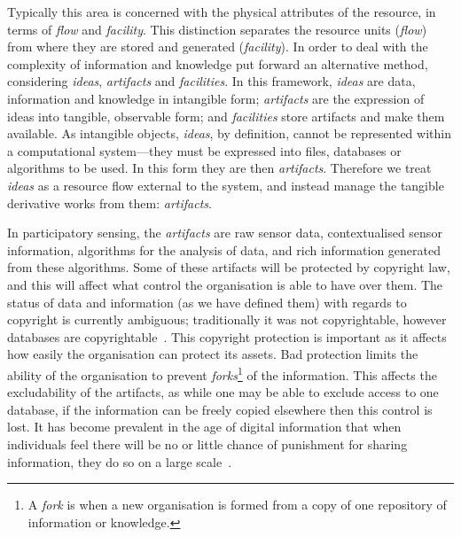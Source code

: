 Typically this area is concerned with the physical attributes of the resource, in terms of \emph{flow} and \emph{facility}. This distinction separates the resource units (\emph{flow}) from where they are stored and generated (\emph{facility}). In order to deal with the complexity of information and knowledge  put forward an alternative method, considering \emph{ideas}, \emph{artifacts} and \emph{facilities}. 
In this framework, \emph{ideas} are data, information and knowledge in intangible form; \emph{artifacts} are the expression of ideas into tangible, observable form; and \emph{facilities} store artifacts and make them available. 
As intangible objects, \emph{ideas}, by definition, cannot be represented within a computational system---they must be expressed into files, databases or algorithms to be used. In this form they are then \emph{artifacts}. Therefore we treat \emph{ideas} as a resource flow external to the system, and instead manage the tangible derivative works from them: \emph{artifacts}.

In participatory sensing, the \emph{artifacts} are raw sensor data,
contextualised sensor information, algorithms for the analysis of data, and
rich information generated from these algorithms. Some of these artifacts will
be protected by copyright law, and this will affect what control the
organisation is able to have over them. The status of data and information (as
we have defined them) with regards to copyright is currently ambiguous;
traditionally it was not copyrightable, however databases are
copyrightable~\citep{Miller2008}. This copyright protection is important as it
affects how easily the organisation can protect its assets. Bad protection
limits the ability of the organisation to prevent \emph{forks}\footnote{A \emph{fork} is when a new organisation is formed from a copy of one repository of information or knowledge.} of the
information. This affects the excludability of the artifacts, as while one may
be able to exclude access to one database, if the information can be freely
copied elsewhere then this control is lost. It has become prevalent in the age
of digital information that when individuals feel there will be no or little
chance of punishment for sharing information, they do so on a large
scale~\citep[pp.\ 62--66]{Lessig2004}.

